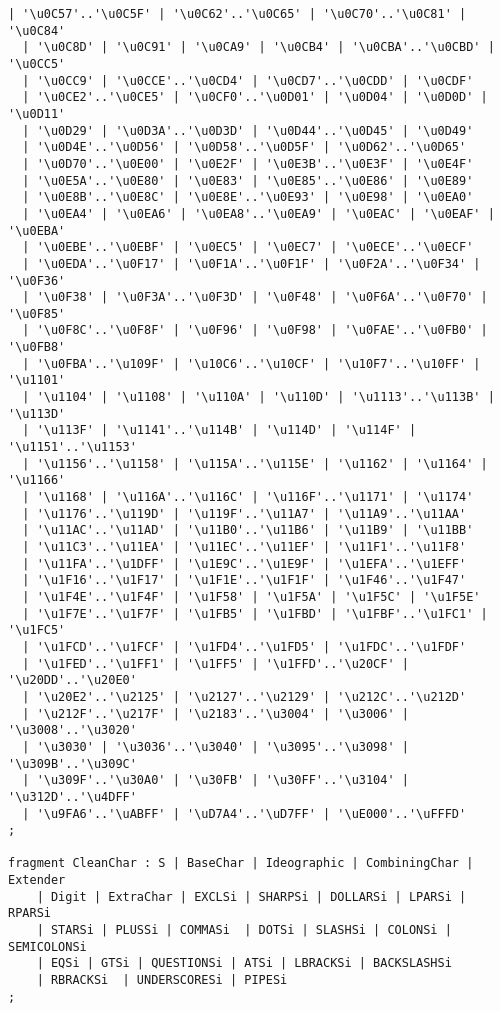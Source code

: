 \begin{Verbatim}[frame=none, fontsize=\footnotesize]
  | '\u0C57'..'\u0C5F' | '\u0C62'..'\u0C65' | '\u0C70'..'\u0C81' | '\u0C84' 
  | '\u0C8D' | '\u0C91' | '\u0CA9' | '\u0CB4' | '\u0CBA'..'\u0CBD' | '\u0CC5'
  | '\u0CC9' | '\u0CCE'..'\u0CD4' | '\u0CD7'..'\u0CDD' | '\u0CDF' 
  | '\u0CE2'..'\u0CE5' | '\u0CF0'..'\u0D01' | '\u0D04' | '\u0D0D' | '\u0D11' 
  | '\u0D29' | '\u0D3A'..'\u0D3D' | '\u0D44'..'\u0D45' | '\u0D49' 
  | '\u0D4E'..'\u0D56' | '\u0D58'..'\u0D5F' | '\u0D62'..'\u0D65' 
  | '\u0D70'..'\u0E00' | '\u0E2F' | '\u0E3B'..'\u0E3F' | '\u0E4F' 
  | '\u0E5A'..'\u0E80' | '\u0E83' | '\u0E85'..'\u0E86' | '\u0E89' 
  | '\u0E8B'..'\u0E8C' | '\u0E8E'..'\u0E93' | '\u0E98' | '\u0EA0' 
  | '\u0EA4' | '\u0EA6' | '\u0EA8'..'\u0EA9' | '\u0EAC' | '\u0EAF' | '\u0EBA' 
  | '\u0EBE'..'\u0EBF' | '\u0EC5' | '\u0EC7' | '\u0ECE'..'\u0ECF' 
  | '\u0EDA'..'\u0F17' | '\u0F1A'..'\u0F1F' | '\u0F2A'..'\u0F34' | '\u0F36' 
  | '\u0F38' | '\u0F3A'..'\u0F3D' | '\u0F48' | '\u0F6A'..'\u0F70' | '\u0F85' 
  | '\u0F8C'..'\u0F8F' | '\u0F96' | '\u0F98' | '\u0FAE'..'\u0FB0' | '\u0FB8' 
  | '\u0FBA'..'\u109F' | '\u10C6'..'\u10CF' | '\u10F7'..'\u10FF' | '\u1101' 
  | '\u1104' | '\u1108' | '\u110A' | '\u110D' | '\u1113'..'\u113B' | '\u113D' 
  | '\u113F' | '\u1141'..'\u114B' | '\u114D' | '\u114F' | '\u1151'..'\u1153' 
  | '\u1156'..'\u1158' | '\u115A'..'\u115E' | '\u1162' | '\u1164' | '\u1166' 
  | '\u1168' | '\u116A'..'\u116C' | '\u116F'..'\u1171' | '\u1174' 
  | '\u1176'..'\u119D' | '\u119F'..'\u11A7' | '\u11A9'..'\u11AA' 
  | '\u11AC'..'\u11AD' | '\u11B0'..'\u11B6' | '\u11B9' | '\u11BB' 
  | '\u11C3'..'\u11EA' | '\u11EC'..'\u11EF' | '\u11F1'..'\u11F8' 
  | '\u11FA'..'\u1DFF' | '\u1E9C'..'\u1E9F' | '\u1EFA'..'\u1EFF' 
  | '\u1F16'..'\u1F17' | '\u1F1E'..'\u1F1F' | '\u1F46'..'\u1F47' 
  | '\u1F4E'..'\u1F4F' | '\u1F58' | '\u1F5A' | '\u1F5C' | '\u1F5E' 
  | '\u1F7E'..'\u1F7F' | '\u1FB5' | '\u1FBD' | '\u1FBF'..'\u1FC1' | '\u1FC5' 
  | '\u1FCD'..'\u1FCF' | '\u1FD4'..'\u1FD5' | '\u1FDC'..'\u1FDF' 
  | '\u1FED'..'\u1FF1' | '\u1FF5' | '\u1FFD'..'\u20CF' | '\u20DD'..'\u20E0' 
  | '\u20E2'..'\u2125' | '\u2127'..'\u2129' | '\u212C'..'\u212D' 
  | '\u212F'..'\u217F' | '\u2183'..'\u3004' | '\u3006' | '\u3008'..'\u3020'
  | '\u3030' | '\u3036'..'\u3040' | '\u3095'..'\u3098' | '\u309B'..'\u309C' 
  | '\u309F'..'\u30A0' | '\u30FB' | '\u30FF'..'\u3104' | '\u312D'..'\u4DFF' 
  | '\u9FA6'..'\uABFF' | '\uD7A4'..'\uD7FF' | '\uE000'..'\uFFFD'
;

fragment CleanChar : S | BaseChar | Ideographic | CombiningChar | Extender 
    | Digit | ExtraChar | EXCLSi | SHARPSi | DOLLARSi | LPARSi | RPARSi 
    | STARSi | PLUSSi | COMMASi  | DOTSi | SLASHSi | COLONSi | SEMICOLONSi 
    | EQSi | GTSi | QUESTIONSi | ATSi | LBRACKSi | BACKSLASHSi 
    | RBRACKSi  | UNDERSCORESi | PIPESi
;


\end{Verbatim}
